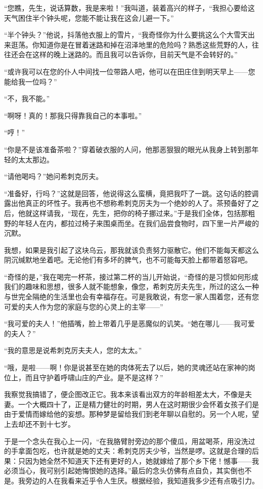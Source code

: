 \par “您瞧，先生，说话算数，我是来啦！”我叫道，装着高兴的样子，“我担心要给这天气困住半个钟头呢，您能不能让我在这会儿避一下。”
\par “半个钟头？”他说，抖落他衣服上的雪片，“我奇怪你为什么要挑这么个大雪天出来逛荡。你知道你是在冒着迷路和掉在沼泽地里的危险吗？熟悉这些荒野的人，往往还会在这样的晚上迷路的。而且我可以告诉你，目前天气是不会转好的。”
\par “或许我可以在您的仆人中间找一位带路人吧，他可以在田庄住到明天早上——您能给我一位吗？”
\par “不，我不能。”
\par “啊呀！真的！那我只得靠我自己的本事啦。”
\par “哼！”
\par “你是不是该准备茶啦？”穿着破衣服的人问，他那恶狠狠的眼光从我身上转到那年轻的太太那边。
\par “请他喝吗？”她问希刺克厉夫。
\par “准备好，行吗？”这就是回答，他说得这么蛮横，竟把我吓了一跳。这句话的腔调露出他真正的坏性子。我再也不想称希刺克厉夫为一个绝妙的人了。茶预备好了之后，他就这样请我，“现在，先生，把你的椅子挪过来。”于是我们全体，包括那粗野的年轻人在内，都拉过椅子来围桌而坐。在我们品尝食物时，四下里一片严峻的沉默。
\par 我想，如果是我引起了这块乌云，那我就该负责努力驱散它。他们不能每天都这么阴沉缄默地坐着吧。无论他们有多坏的脾气，也不可能每天脸上都带着怒容吧。
\par “奇怪的是，”我在喝完一杯茶，接过第二杯的当儿开始说，“奇怪的是习惯如何形成我们的趣味和思想，很多人就不能想象，像您，希刺克厉夫先生，所过的这么一种与世完全隔绝的生活里也会有幸福存在。可是我敢说，有您一家人围着您，还有您可爱的夫人作为您的家庭与您的心灵上的主宰——”
\par “我可爱的夫人！”他插嘴，脸上带着几乎是恶魔似的讥笑。“她在哪儿——我可爱的夫人？”
\par “我的意思是说希刺克厉夫夫人，您的太太。”
\par “哦，是啦——啊！你是说甚至在她的肉体死去了以后，她的灵魂还站在家神的岗位上，而且守护着呼啸山庄的产业。是不是这样？”
\par 我察觉我搞错了，便企图改正它。我本来该看出双方的年龄相差太大，不像是夫妻。一个大概四十了，正是精力健壮的时期，男人在这时期很少会怀着女孩子们是由于爱情而嫁给他的妄想。那种梦是留给我们到老年聊以自慰的。另一个人呢，望上去却还不到十七岁。
\par 于是一个念头在我心上一闪，“在我胳臂肘旁边的那个傻瓜，用盆喝茶，用没洗过的手拿面包吃，也许就是她的丈夫：希刺克厉夫少爷，当然是啰。这就是合理的后果：只因为她全然不知道天下还有更好的人，她就嫁给了那个乡下佬！憾事——我必须当心，我可别引起她悔恨她的选择。”最后的念头仿佛有点自负，其实倒也不是。我旁边的人在我看来近乎令人生厌。根据经验，我知道我多少还有点吸引力。
